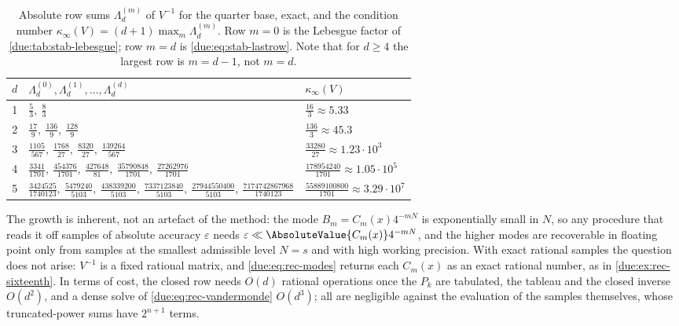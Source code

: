 \documentclass[11pt,oneside]{article}
\theoremstyle{plain}
\theoremstyle{definition}
\theoremstyle{remark}
\newcommand{\Cr}[2]{C_{#1}\!\left(#2\right)}                %
\begin{document}
\begin{table}[htbp]
\centering
\caption{Absolute row sums $\Lambda^{(m)}_{d}$ of $V^{-1}$ for the quarter
base, exact, and the condition number
$\kappa_{\infty}(V)=(d+1)\max_{m}\Lambda^{(m)}_{d}$.  Row $m=0$ is the
Lebesgue factor of \cref{due:tab:stab-lebesgue}; row $m=d$ is
\cref{due:eq:stab-lastrow}.  Note that for $d\ge4$ the largest row is
$m=d-1$, not $m=d$.}
\label{due:tab:stab-condition}
\begin{tabular}{c@{\quad}l@{\quad}l}
\toprule
$d$ & $\Lambda^{(0)}_{d},\Lambda^{(1)}_{d},\ldots,\Lambda^{(d)}_{d}$ & $\kappa_{\infty}(V)$\\
\midrule
1 & $\tfrac53,\ \tfrac83$ & $\tfrac{16}{3}\approx5.33$\\[2pt]
2 & $\tfrac{17}{9},\ \tfrac{136}{9},\ \tfrac{128}{9}$ & $\tfrac{136}{3}\approx45.3$\\[2pt]
3 & $\tfrac{1105}{567},\ \tfrac{1768}{27},\ \tfrac{8320}{27},\ \tfrac{139264}{567}$
  & $\tfrac{33280}{27}\approx1.23\cdot10^{3}$\\[2pt]
4 & $\tfrac{3341}{1701},\ \tfrac{454376}{1701},\ \tfrac{427648}{81},\ \tfrac{35790848}{1701},\ \tfrac{27262976}{1701}$
  & $\tfrac{178954240}{1701}\approx1.05\cdot10^{5}$\\[2pt]
5 & $\tfrac{3424525}{1740123},\ \tfrac{5479240}{5103},\ \tfrac{438339200}{5103},\ \tfrac{7337123840}{5103},\ \tfrac{27944550400}{5103},\ \tfrac{7174742867968}{1740123}$
  & $\tfrac{55889100800}{1701}\approx3.29\cdot10^{7}$\\
\bottomrule
\end{tabular}
\end{table}

The growth is inherent, not an artefact of the method: the mode
$B_{m}=\Cr{m}{x}4^{-mN}$ is exponentially small in $N$, so any procedure that
reads it off samples of absolute accuracy $\varepsilon$ needs
$\varepsilon\ll\AbsoluteValue{\Cr{m}{x}}4^{-mN}$, and the higher modes are
recoverable in floating point only from samples at the smallest admissible
level $N=s$ and with high working precision.  With exact rational samples the
question does not arise: $V^{-1}$ is a fixed rational matrix, and
\cref{due:eq:rec-modes} returns each $\Cr{m}{x}$ as an exact rational number,
as in \cref{due:ex:rec-sixteenth}.  In terms of cost, the closed row needs
$O(d)$ rational operations once the $P_{k}$ are tabulated, the tableau and
the closed inverse $O(d^{2})$, and a dense solve of
\cref{due:eq:rec-vandermonde} $O(d^{3})$; all are negligible against the
evaluation of the samples themselves, whose truncated-power sums have
$2^{n+1}$ terms.
\end{document}
